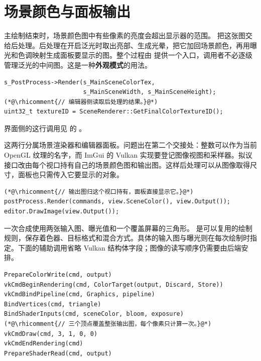 \clearpage
\begingroup
\setlength{\parskip}{8pt}
\section{场景颜色与面板输出}
主绘制结束时，场景颜色图中有些像素的亮度会超出显示器的范围。 把这张图交给后处理。后处理在开启泛光时取出亮部、生成光晕，把它加回场景颜色，再用曝光和色调映射生成面板要显示的图。整个过程由  提供一个入口，调用者不必逐级管理泛光的中间图。这是一种\textbf{外观模式}的用法。

\begin{lstlisting}
s_PostProcess->Render(s_MainSceneColorTex,
                      s_MainSceneWidth, s_MainSceneHeight);
(*@\rhicomment{// 编辑器侧读取后处理的结果。}@*)
uint32_t textureID = SceneRenderer::GetFinalColorTextureID();
\end{lstlisting}
界面侧的这行调用见  的 。

这两行分属场景渲染器和编辑器面板。问题出在第二个交接处：整数可以作为当前 OpenGL 纹理的名字，而 ImGui 的 Vulkan 实现要登记图像视图和采样器。拟议接口改由每个视口持有自己的场景颜色图和输出图。这样后处理可以从图像取得尺寸，面板也只需传入它要显示的对象。
\begin{lstlisting}
(*@\rhicomment{// 输出图归这个视口持有，面板直接显示它。}@*)
postProcess.Render(commands, view.SceneColor(), view.Output());
editor.DrawImage(view.Output());
\end{lstlisting}

一次合成使用两张输入图、曝光值和一个覆盖屏幕的三角形。 是可以复用的绘制规则，保存着色器、目标格式和混合方式。具体的输入图与曝光则在每次绘制时指定。下面的辅助调用省略 Vulkan 结构体字段；图像的读写顺序仍需要由后端安排。
\begin{lstlisting}
PrepareColorWrite(cmd, output)
vkCmdBeginRendering(cmd, ColorTarget(output, Discard, Store))
vkCmdBindPipeline(cmd, Graphics, pipeline)
BindVertices(cmd, triangle)
BindShaderInputs(cmd, sceneColor, bloom, exposure)
(*@\rhicomment{// 三个顶点覆盖整张输出图，每个像素只计算一次。}@*)
vkCmdDraw(cmd, 3, 1, 0, 0)
vkCmdEndRendering(cmd)
PrepareShaderRead(cmd, output)
\end{lstlisting}

